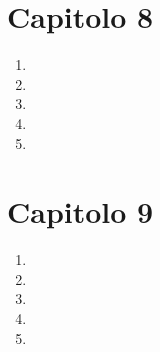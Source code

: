 \documentclass[ paper=a4
              , pagesize
              , fontsize=12pt
              , twoside=true
              , BCOR=5mm
              , DIV=calc
              , bibliography=totoc
              , final
              , version=last
              ]{scrbook}
\begin{document}
\section*{Capitolo 8}
\begin{enumerate}
    \item
    \item     
    \item     
    \item     
    \item 
\end{enumerate}
\section*{Capitolo 9}
\begin{enumerate}
    \item
    \item     
    \item     
    \item     
    \item 
\end{enumerate}
\end{document}

